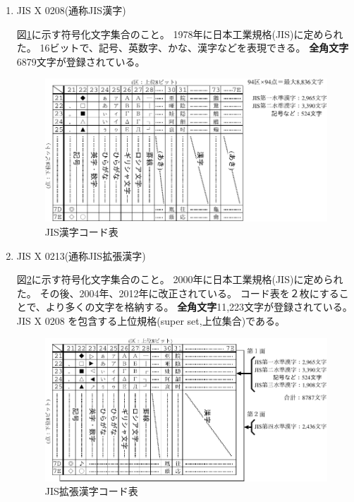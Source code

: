 \documentclass[uplatex,a4j,dvipdfmx]{ujarticle}
\begin{document}
\begin{enumerate}
\begin{enumerate}
\newpage

\item JIS X 0208(通称JIS漢字)

図\ref{fig4}に示す符号化文字集合のこと。
1978年に日本工業規格(JIS)に定められた。
16ビットで、記号、英数字、かな、漢字などを表現できる。
{\bf 全角文字}6879文字が登録されている。

\begin{figure}[hbtp]
\begin{center}
\includegraphics[scale=0.9]{jisx0208.pdf}
\caption{JIS漢字コード表}
\label{fig4}
\end{center}
\end{figure}

\item JIS X 0213(通称JIS拡張漢字)

図\ref{fig5}に示す符号化文字集合のこと。
2000年に日本工業規格(JIS)に定められた。
その後、2004年、2012年に改正されている。
コード表を２枚にすることで、より多くの文字を格納する。
{\bf 全角文字}11,223文字が登録されている。
JIS X 0208 を包含する上位規格(super set,上位集合)である。

\begin{figure}[hbtp]
\begin{center}
\includegraphics[scale=0.9]{jisx0213.pdf}
\caption{JIS拡張漢字コード表}
\label{fig5}
\end{center}
\end{figure}


\end{enumerate}
\end{enumerate}
\end{document}
